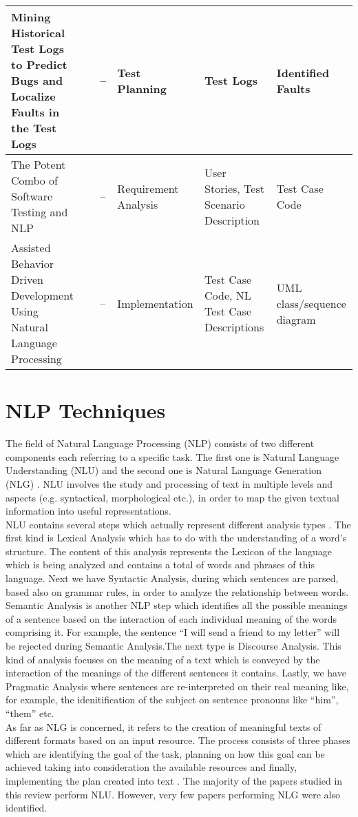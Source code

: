 \begin{longtable}{|p{3cm}|p{1cm}|p{2.5cm}|p{2.8cm}|p{2.5cm}|p{2.5cm}|}
            \hline Mining Historical Test Logs to Predict Bugs and Localize Faults in the Test Logs & \cite{8812113} & --& Test Planning & Test Logs & Identified Faults\\
            \hline The Potent Combo of Software Testing and NLP & \cite{mulla2020potent} & --& Requirement Analysis& User Stories, Test Scenario Description & Test Case Code\\
            \hline Assisted Behavior Driven Development Using Natural Language Processing & \cite{soeken2012assisted} & --& Implementation & Test Case Code, NL Test Case Descriptions & UML class/sequence diagram\\
        \hline
\end{longtable}

\section{NLP Techniques}
The field of Natural Language Processing (NLP) consists of two different components each referring to a specific task. The first one is Natural Language Understanding (NLU) and the second one is Natural Language 
Generation (NLG) \cite{liddy2001natural, khurana2017natural}. NLU involves the study and processing of text in multiple levels and aspects (e.g. syntactical, morphological etc.), in order to map the given textual 
information into useful representations. \\
NLU contains several steps which actually represent different analysis types \cite{liddy2001natural}. The first kind is Lexical Analysis which has to do with the understanding of a word's structure. 
The content of this analysis represents the Lexicon of the language which is being analyzed and contains a total of words and phrases of this language. Next we have Syntactic Analysis, during which sentences are parsed, 
based also on grammar rules, in order to analyze the relationship between words. Semantic Analysis is another NLP 
step which identifies all the possible meanings of a sentence based on the interaction of each individual meaning of the words comprising it.  For example, the sentence ``I will send a friend to my letter'' will be rejected 
during Semantic Analysis.The next type is Discourse Analysis. This kind of analysis focuses on the meaning of a text which is conveyed by the interaction of the meanings of the different sentences it contains. Lastly, we have 
Pragmatic Analysis where sentences are re-interpreted on their real meaning like, for example, the idenitification of the subject on sentence pronouns like ``him'', ``them'' etc.\\ As far as NLG is concerned, 
it refers to the creation of meaningful texts of different formats based on an input resource. The process consists of three phases which are identifying the goal of the task, planning on how this goal can 
be achieved taking into consideration the available resources and finally, implementing the plan created into text \cite{khurana2017natural}. The majority of the papers studied in this review perform NLU. 
However, very few papers performing NLG were also identified.


